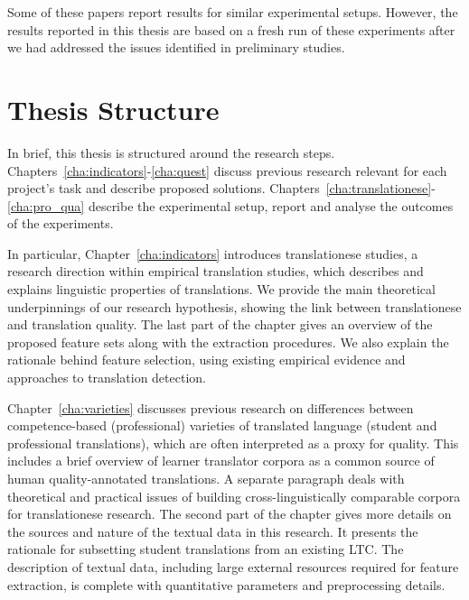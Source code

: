 Some of these papers report results for similar experimental setups. However, the results reported in this thesis are based on a fresh run of these experiments after we had addressed the issues identified in preliminary studies. 

\section{\label{sec:structure}Thesis Structure}

In brief, this thesis is structured around the research steps. Chapters~\ref{cha:indicators}-\ref{cha:quest} discuss previous research relevant for each project's task and describe proposed solutions. Chapters~\ref{cha:translationese}-\ref{cha:pro_qua} describe the experimental setup, report and analyse the outcomes of the experiments. 

In particular, Chapter~\ref{cha:indicators} introduces translationese studies, a research direction within empirical translation studies, which describes and explains linguistic properties of translations. We provide the main theoretical underpinnings of our research hypothesis, showing the link between translationese and translation quality. The last part of the chapter gives an overview of the proposed feature sets along with the extraction procedures. We also explain the rationale behind feature selection, using existing empirical evidence and approaches to translation detection.
 
Chapter~\ref{cha:varieties} discusses previous research on differences between competence-based (professional) varieties of translated language (student and professional translations), which are often interpreted as a proxy for quality. This includes a brief overview of learner translator corpora as a common source of human quality-annotated translations.
A separate paragraph deals with theoretical and practical issues of building cross-linguistically comparable corpora for translationese research.  
The second part of the chapter gives more details on the sources and nature of the textual data in this research. It presents the rationale for subsetting student translations from an existing \gls{LTC}. The description of textual data, including large external resources required for feature extraction, is complete with quantitative parameters and preprocessing details.


